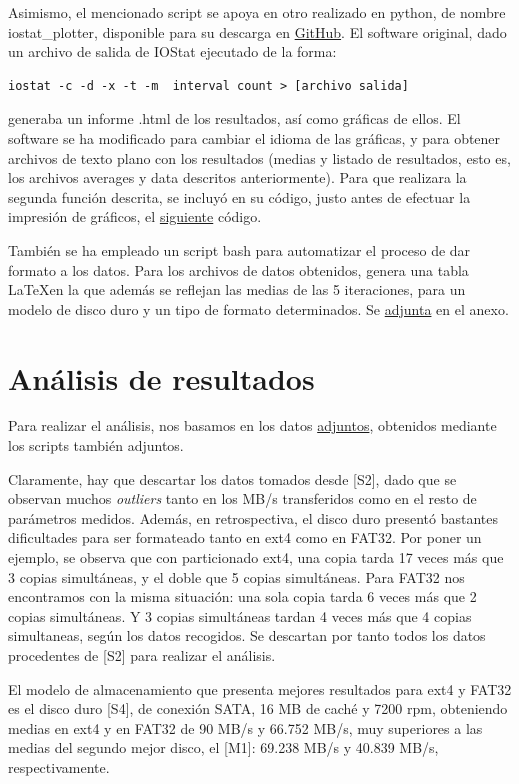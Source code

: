 \documentclass[a4paper,10pt]{article}
\renewcommand{\texttt}[2][black!60]{\textcolor{#1}{\ttfamily #2}}
\begin{document}
Asimismo, el mencionado script se apoya en otro realizado en \texttt{python}, de nombre \texttt{iostat\_plotter}, disponible
para su descarga en \href{https://github.com/s3h10r/iostat-plotter}{GitHub}. El software original, dado  un archivo
de salida de IOStat ejecutado de la forma:
\begin{lstlisting}[style=BashInputStyle]
 iostat -c -d -x -t -m  interval count > [archivo salida]
\end{lstlisting}
generaba un informe \texttt{.html} de los resultados, así como gráficas de ellos. El software se ha modificado
para cambiar el idioma de las gráficas, y para obtener archivos de texto plano con los resultados (medias y listado
de resultados, esto es, los archivos \texttt{averages} y \texttt{data} descritos anteriormente). Para que realizara
la segunda función descrita, se incluyó en su código, justo antes de efectuar la impresión de gráficos, el \hyperlink{pyscript}{siguiente}
código.

También se ha empleado un script bash para automatizar el proceso de dar formato a los datos. Para los archivos de
datos obtenidos, genera una tabla \LaTeX en la que además se reflejan las medias de las 5 iteraciones, para un
modelo de disco duro y un tipo de formato determinados. Se \hyperlink{gentables}{adjunta} en el anexo.
 \section{Análisis de resultados}
 Para realizar el análisis, nos basamos en los datos \hyperlink{tablas}{adjuntos}, obtenidos mediante los scripts también adjuntos.
 
 Claramente, hay que descartar los datos tomados desde [S2], dado que se observan muchos \textit{outliers} tanto en los MB/s
 transferidos como en el resto de parámetros medidos. Además, en retrospectiva, el disco duro presentó bastantes 
 dificultades para ser formateado tanto en ext4 como en FAT32. Por poner un ejemplo, se observa que con particionado
 ext4, una copia tarda 17 veces más que 3 copias simultáneas, y el doble que 5 copias simultáneas. Para FAT32 nos
 encontramos con la misma situación: una sola copia tarda 6 veces más que 2 copias simultáneas. Y 3 copias simultáneas tardan
 4 veces más que 4 copias simultaneas, según los datos recogidos. Se descartan por tanto todos los datos procedentes
 de [S2] para realizar el análisis.
 
 El modelo de almacenamiento que presenta mejores resultados para ext4 y FAT32 es el disco duro [S4], de conexión
 SATA, 16 MB de caché y 7200 rpm, obteniendo medias en ext4 y en FAT32 de 90 MB/s y 66.752 MB/s, muy superiores
 a las medias del segundo mejor disco, el [M1]: 69.238 MB/s y 40.839 MB/s, respectivamente.
 
\end{document}

